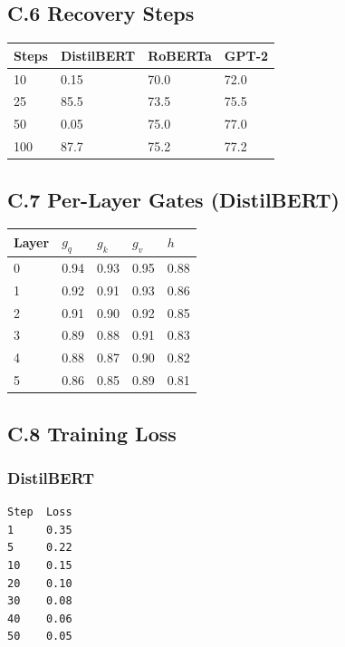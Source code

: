 \subsection{C.6 Recovery Steps}

\begin{table}[H]
\centering
\small
\begin{tabular}{llll}
\toprule
\textbf{Steps} & \textbf{DistilBERT} & \textbf{RoBERTa} & \textbf{GPT-2} \\
\midrule
10 & 0.15 & 70.0 & 72.0 \\
25 & 85.5 & 73.5 & 75.5 \\
50 & 0.05 & 75.0 & 77.0 \\
100 & 87.7 & 75.2 & 77.2 \\
\bottomrule
\end{tabular}
\end{table}

\subsection{C.7 Per-Layer Gates (DistilBERT)}

\begin{table}[H]
\centering
\small
\begin{tabular}{lllll}
\toprule
\textbf{Layer} & \textbf{$g_q$} & \textbf{$g_k$} & \textbf{$g_v$} & \textbf{$h$} \\
\midrule
0 & 0.94 & 0.93 & 0.95 & 0.88 \\
1 & 0.92 & 0.91 & 0.93 & 0.86 \\
2 & 0.91 & 0.90 & 0.92 & 0.85 \\
3 & 0.89 & 0.88 & 0.91 & 0.83 \\
4 & 0.88 & 0.87 & 0.90 & 0.82 \\
5 & 0.86 & 0.85 & 0.89 & 0.81 \\
\bottomrule
\end{tabular}
\end{table}

\subsection{C.8 Training Loss}

\subsubsection{DistilBERT}
\begin{lstlisting}
Step  Loss
1     0.35
5     0.22
10    0.15
20    0.10
30    0.08
40    0.06
50    0.05
\end{lstlisting}

